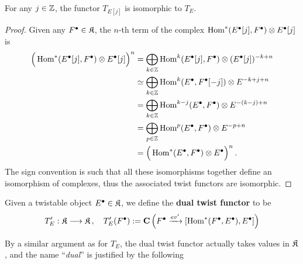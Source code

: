 \begin{cor}
	For any $j \in {\mathbb Z}$, the functor $T_{E[j]}$ is isomorphic to $T_{E}$.
	\begin{proof}
		Given any $F^{\bullet} \in \mathfrak{K}$, the $n$-th term of the
		complex $\operatorname{Hom}^{*}(E^{\bullet}[j],F^{\bullet}) \otimes E^{\bullet}[j]$
		is
		\begin{align*}
			\Big( \operatorname{Hom}^{*}(E^{\bullet}[j],F^{\bullet}) \otimes E^{\bullet}[j] \Big)^{n}
			&= \bigoplus_{k \in {\mathbb Z}} \operatorname{Hom}^{k}(E^{\bullet}[j],F^{\bullet}) \otimes (E^{\bullet}[j])^{-k+n} \\
			&\simeq \bigoplus_{k \in {\mathbb Z}} \operatorname{Hom}^{k}(E^{\bullet},F^{\bullet}[-j]) \otimes E^{-k+j+n} \\
			&= \bigoplus_{k \in {\mathbb Z}} \operatorname{Hom}^{k-j}(E^{\bullet},F^{\bullet}) \otimes E^{-(k-j)+n} \\
			&= \bigoplus_{p \in {\mathbb Z}} \operatorname{Hom}^{p}(E^{\bullet},F^{\bullet}) \otimes E^{-p+n} \\
			&= \Big( \operatorname{Hom}^{*}(E^{\bullet},F^{\bullet}) \otimes E^{\bullet} \Big)^{n}\,.
		\end{align*}
		The sign convention is such that all these isomorphisms together define
		an isomorphism of complexes, thus the associated twist functors are isomorphic.
	\end{proof}
\end{cor}

\begin{df}
	Given a twistable object $E^{\bullet} \in \mathfrak{K}$, 
	we define the \textbf{dual twist functor} to be %
	\begin{equation*}
		T'_{E}: \mathfrak{K} \longrightarrow \mathfrak{K}\,, \quad
		T'_{E}(F^{\bullet}) := {\normalfont\textbf{C}}\left( F^{\bullet} \xrightarrow{ev'} 
		[\operatorname{Hom}^{*}(F^{\bullet},E^{\bullet}),E^{\bullet}]  \right)
	\end{equation*}
\end{df}

By a similar argument as for $T_{E}$, the dual twist functor actually
takes values in $\mathfrak{K}$, and the name ``\emph{dual}'' is justified by the following


